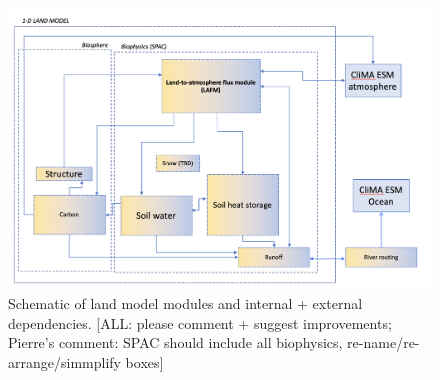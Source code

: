 \documentclass{article}
\begin{document}
\begin{figure}[htb]
\includegraphics[width=\textwidth,height=\textheight,keepaspectratio]{CLIMA-land/LM_figures/JPLCLIMA_LM_DESIGN_20191115.png}
\caption{Schematic of land model modules and internal + external dependencies. [ALL: please comment + suggest improvements; Pierre's comment: SPAC should include all biophysics, re-name/re-arrange/simmplify boxes]}
\end{figure}
\end{document}
